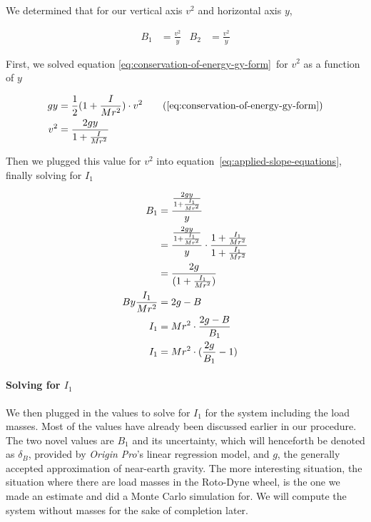 \documentclass[coverpage]{article}
\newcommand{\softwareText}[1]{\textit{#1}\texttrademark}
\newcommand{\origin}{\softwareText{Origin Pro}}
\newcommand{\rwheel}{Roto-Dyne wheel}
\begin{document}
	We determined that for our vertical axis $v^2$ and horizontal axis $y$,
	
	\begin{align}
		B_1 &= \frac{v^2}{y} &
		B_2 &= \frac{v^2}{y} \label{eq:applied-slope-equations}
	\end{align}

	First, we solved equation \ref{eq:conservation-of-energy-gy-form}~for $v^2$ as a function of $y$
	
	\begin{align}
		gy &= \frac{1}{2}(1 + \frac{I}{Mr^2}) \cdot v^2 \tag{\ref{eq:conservation-of-energy-gy-form}} \\
		v^2 &= \frac{2gy}{1 + \frac{I}{Mr^2}}
	\end{align}

	Then we plugged this value for $v^2$ into equation~\ref{eq:applied-slope-equations}, finally solving for $I_1$
	
	\begin{align}
		B_1 &= \frac{\frac{2gy}{1 + \frac{I_1}{Mr^2}}}{y} \notag \\
		&= \frac{\frac{2gy}{1 + \frac{I_1}{Mr^2}}}{y} \cdot \frac{1 + \frac{I_1}{Mr^2}}{1 + \frac{I_1}{Mr^2}} \notag \\
		&= \frac{2g}{(1 + \frac{I_1}{Mr^2})} \notag \\
		By\frac{I_1}{Mr^2} &= 2g - B \notag \\
		I_1 &= Mr^2 \cdot \frac{2g - B}{B_1} \notag \\
		I_1 &= Mr^2 \cdot (\frac{2g}{B_1} - 1) \label{eq:i-for-masses}
	\end{align}

	\newcommand{\massSlopeUncert}{\delta_B}

	\paragraph{Solving for $I_1$}
	We then plugged in the values to solve for $I_1$ for the system including the load masses. Most of the values have already been discussed earlier in our procedure. The two novel values are $B_1$ and its uncertainty, which will henceforth be denoted as $\delta_B$, provided by \origin's linear regression model, and $g$, the generally accepted approximation of near-earth gravity. The more interesting situation, the situation where there are load masses in the \rwheel, is the one we made an estimate and did a Monte Carlo simulation for. We will compute the system without masses for the sake of completion later. 
	
\end{document}
